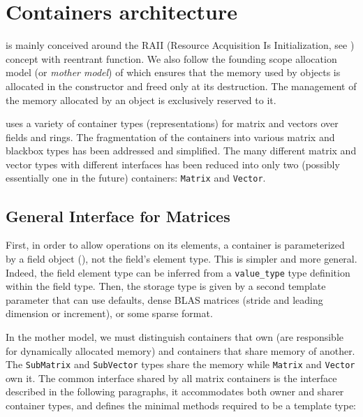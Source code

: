 \section{Containers architecture}\label{sec:container}
%
\linbox is mainly conceived around the RAII (Resource Acquisition Is
Initialization, see \cite{stroustrup1994design}) concept with reentrant
function. We also follow the {founding scope allocation} model (or \emph{mother
model}) of \cite{Dumas:2010:lbpar} which ensures that the memory used by
objects is allocated in the constructor and freed only at its destruction. The
management of the memory allocated by an object is exclusively reserved to it.
%
\par
%
\linbox uses a variety of container types (representations) for matrix and vectors over fields and rings.
The fragmentation of the containers into various matrix and
blackbox types has been addressed and simplified. The many different matrix and
vector types with different interfaces has been reduced into only two
(possibly essentially one in the future) containers: \texttt{Matrix} and
\texttt{Vector}.
%
\subsection{General Interface for %
Matrices}
%
First, in order to allow operations on its elements, a container is
parameterized by a field object (), not the field's element
type. This is simpler and more general.
Indeed, the field element type can be inferred from a
\verb!value_type! type definition within the field type.
Then, the storage type is given by a second
template parameter that can use defaults,
\eg dense BLAS matrices (stride
and leading dimension or increment), or some sparse format.
%

%
In the mother model, we must distinguish containers that own (are responsible
for dynamically allocated memory) and containers that share memory of another.  The
\texttt{SubMatrix} and \texttt{SubVector} types share the memory while
\texttt{Matrix} and \texttt{Vector} own it.
%
The common interface shared by all matrix containers is the \applin  interface
described in the following paragraphs, it accommodates both owner and sharer
container types, and defines the minimal methods required to be a
template \applin type:
%
% 
%
%

